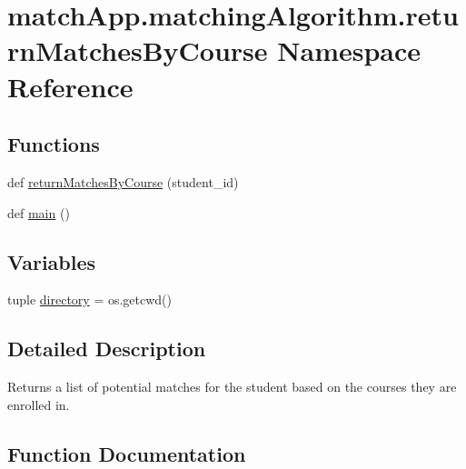 \hypertarget{namespacematch_app_1_1matching_algorithm_1_1return_matches_by_course}{}\section{match\+App.\+matching\+Algorithm.\+return\+Matches\+By\+Course Namespace Reference}
\label{namespacematch_app_1_1matching_algorithm_1_1return_matches_by_course}
\subsection*{Functions}
\begin{DoxyCompactItemize}
\item 
def \hyperlink{namespacematch_app_1_1matching_algorithm_1_1return_matches_by_course_a5abe6a866de470a2e7f8bb92528d6829}{return\+Matches\+By\+Course} (student\+\_\+id)
\item 
def \hyperlink{namespacematch_app_1_1matching_algorithm_1_1return_matches_by_course_a886c9bc71525e5e4a77d11b1e0c9348d}{main} ()
\end{DoxyCompactItemize}
\subsection*{Variables}
\begin{DoxyCompactItemize}
\item 
tuple \hyperlink{namespacematch_app_1_1matching_algorithm_1_1return_matches_by_course_afbaeb47c873756408e671b4f031bb922}{directory} = os.\+getcwd()
\end{DoxyCompactItemize}


\subsection{Detailed Description}
\begin{DoxyVerb}Returns a list of potential matches for the student based on the courses they are enrolled in. \end{DoxyVerb}
 

\subsection{Function Documentation}
\hypertarget{namespacematch_app_1_1matching_algorithm_1_1return_matches_by_course_a886c9bc71525e5e4a77d11b1e0c9348d}{}
